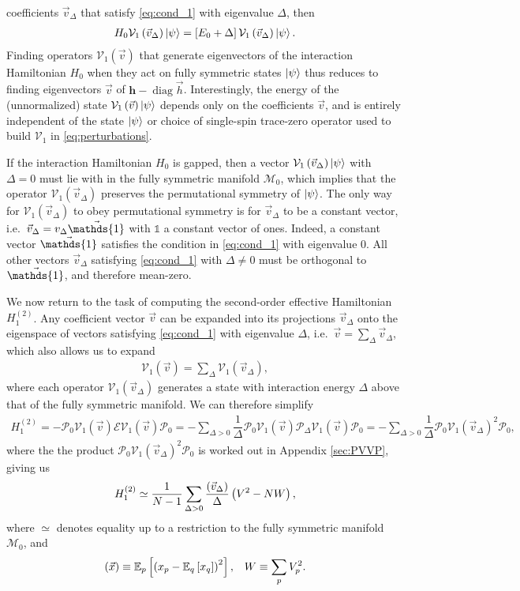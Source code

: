 \documentclass[nofootinbib,notitlepage,11pt]{revtex4-2}
\newcommand{\f}[2]{\dfrac{#1}{#2}} %
\newcommand{\p}[1]{\left(#1\right)} %
\renewcommand{\sp}[1]{\left[#1\right]} %
\newcommand{\m}{\bm} %
\renewcommand{\v}{\vec} %
\newcommand{\1}{\mathds{1}}
\newcommand{\E}{\mathcal{E}}
\newcommand{\M}{\mathcal{M}}
\renewcommand{\P}{\mathcal{P}}
\newcommand{\V}{\mathcal{V}}
\newcommand{\EE}{\mathbb{E}}
\let\var\relax
\DeclareMathOperator{\var}{var}
\DeclareMathOperator{\diag}{diag}
\begin{document}
coefficients $\v v_\Delta$ that satisfy \eqref{eq:cond_1} with
eigenvalue $\Delta$, then
\begin{align}
  H_0 \V_1\p{\v v_\Delta} \ket\psi
  = \sp{E_0 + \Delta} \V_1\p{\v v_\Delta} \ket\psi.
\end{align}
Finding operators $\V_1\p{\v v}$ that generate eigenvectors of the
interaction Hamiltonian $H_0$ when they act on fully symmetric states
$\ket\psi$ thus reduces to finding eigenvectors $\v v$ of
$\m h-\diag\v h$.  Interestingly, the energy of the (unnormalized)
state $\V_1\p{\v v}\ket\psi$ depends only on the coefficients $\v v$,
and is entirely independent of the state $\ket\psi$ or choice of
single-spin trace-zero operator used to build $\V_1$ in
\eqref{eq:perturbations}.

If the interaction Hamiltonian $H_0$ is gapped, then a vector
$\V_1\p{\v v_\Delta}\ket\psi$ with $\Delta=0$ must lie with in the
fully symmetric manifold $\M_0$, which implies that the operator
$\V_1\p{\v v_\Delta}$ preserves the permutational symmetry of
$\ket\psi$.  The only way for $\V_1\p{\v v_\Delta}$ to obey
permutational symmetry is for $\v v_\Delta$ to be a constant vector,
i.e.~$\v v_\Delta=v_\Delta\v\1$ with $\1$ a constant vector of ones.
Indeed, a constant vector $\v\1$ satisfies the condition in
\eqref{eq:cond_1} with eigenvalue $0$.  All other vectors
$\v v_\Delta$ satisfying \eqref{eq:cond_1} with $\Delta\ne0$ must be
orthogonal to $\v\1$, and therefore mean-zero.

We now return to the task of computing the second-order effective
Hamiltonian $H_1^{(2)}$.  Any coefficient vector $\v v$ can be
expanded into its projections $\v v_\Delta$ onto the eigenspace of
vectors satisfying \eqref{eq:cond_1} with eigenvalue $\Delta$,
i.e.~$\v v = \sum_\Delta \v v_\Delta$, which also allows us to expand
\begin{align}
  \V_1\p{\v v} = \sum_\Delta \V_1\p{\v v_\Delta},
\end{align}
where each operator $\V_1\p{\v v_\Delta}$ generates a state with
interaction energy $\Delta$ above that of the fully symmetric
manifold.  We can therefore simplify
\begin{align}
  H_1^{(2)}
  = -\P_0 \V_1\p{\v v} \E \V_1\p{\v v} \P_0
  = - \sum_{\Delta>0} \f1{\Delta}
  \P_0 \V_1\p{\v v} \P_\Delta \V_1\p{\v v} \P_0
  = - \sum_{\Delta>0} \f1{\Delta} \P_0 \V_1\p{\v v_\Delta}^2 \P_0,
\end{align}
where the the product $\P_0 \V_1\p{\v v_\Delta}^2 \P_0$ is worked out
in Appendix \ref{sec:PVVP}, giving us
\begin{align}
  H_1^{(2)} \simeq \f1{N-1} \sum_{\Delta>0}
  \f{\var\p{\v v_\Delta}}{\Delta} \p{V^2 - N W},
  \label{eq:H_1_2}
\end{align}
where $\simeq$ denotes equality up to a restriction to the fully
symmetric manifold $\M_0$, and
\begin{align}
  \var\p{\v x} \equiv \EE_p\sp{\p{x_p-\EE_q\sp{x_q}}^2},
  &&
  W \equiv \sum_p V_p^2.
\end{align}
\end{document}
